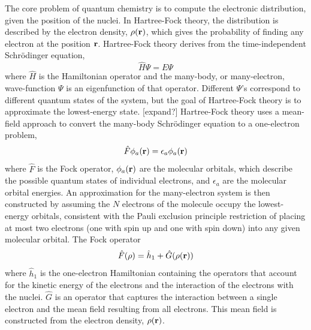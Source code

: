 \documentclass[twoside,11pt]{article}
\begin{document}
The core problem of quantum chemistry is to compute the electronic distribution, given the position of the nuclei. In Hartree-Fock theory, the distribution is described by the electron density, $\rho({\bf r})$, which gives the probability of finding any electron at the position ${\bf r}$. Hartree-Fock theory derives from the time-independent Schr\"{o}dinger equation,
\begin{equation} \label{eq:schrodinger}
				\hat{H}\Psi = E\Psi
\end{equation}
where $\hat{H}$ is the Hamiltonian operator and the many-body, or many-electron, wave-function $\Psi$ is an eigenfunction of that operator. Different $\Psi$'s correspond to different quantum states of the system, but the goal of Hartree-Fock theory is to approximate the lowest-energy state. [expand?]  Hartree-Fock theory uses a mean-field approach to convert the many-body Schr\"{o}dinger equation to a one-electron problem,
\begin{equation} \label{eq:fockSchrodinger}
				\hat{F}\phi_a({\bf r}) = \epsilon_a \phi_a({\bf r})
\end{equation}
where $\hat{F}$ is the Fock operator, $\phi_a({\bf r})$ are the molecular orbitals, which describe the possible quantum states of individual electrons, and $\epsilon_a$ are the molecular orbital energies. An approximation for the many-electron system is then constructed by assuming the $N$ electrons of the molecule occupy the lowest-energy orbitals, consistent with the Pauli exclusion principle restriction of placing at most two electrons (one with spin up and one with spin down) into any given molecular orbital. The Fock operator
\begin{equation} \label{eq:fock}
\hat{F}(\rho) = \hat{h}_1 + \hat{G}(\rho({\bf r}))
\end{equation}
where $\hat{h}_1$ is the one-electron Hamiltonian containing the operators that account for the kinetic energy of the electrons and the interaction of the electrons with the nuclei. $\hat{G}$ is an operator that captures the interaction between a single electron and the mean field resulting from all electrons. This mean field is constructed from the electron density, $\rho({\bf r})$. 
\end{document}

